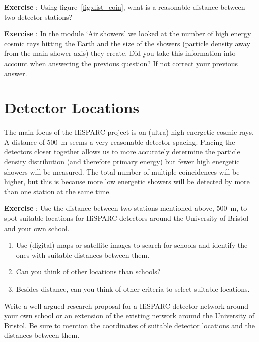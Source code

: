 \documentclass[12pt,a4paper]{article}
\numberwithin{equation}{section}
\numberwithin{figure}{section}
\newcounter{Exercise}
\numberwithin{table}{section}
\begin{document}
\begin{shaded}
\textbf{Exercise \theExercise {}} : Using figure~\ref{fig:dist_coin}, what is a reasonable distance between two detector stations? \end{shaded}

\begin{shaded}
\textbf{Exercise \theExercise {}} : In the module `Air showers' we looked at the number of high energy cosmic rays hitting the Earth and the size of the showers (particle density away from the main shower axis) they create. Did you take this information into account when answering the previous question? If not correct your previous answer.
\end{shaded}

\section{Detector Locations}
The main focus of the HiSPARC project is on (ultra) high energetic cosmic rays.  A distance of 500~m seems a very reasonable detector spacing. Placing the detectors closer together allows us to more accurately determine the particle density distribution (and therefore primary energy) but fewer high energetic showers will be measured. The total number of multiple coincidences will be higher, but this is because more low energetic showers will be detected by more than one station at the same time.

\begin{shaded}
\textbf{Exercise \theExercise {}} : Use the distance between two stations mentioned above, 500~m, to spot suitable locations for HiSPARC detectors around the University of Bristol and your own school.
\begin{enumerate}[-]
\item Use (digital) maps or satellite images to search for schools and identify the ones with suitable distances between them.
\item Can you think of other locations than schools?
\item Besides distance, can you think of other criteria to select suitable locations.
\end{enumerate}
Write a well argued research proposal for a HiSPARC detector network around your own school or an extension of the existing network around the University of Bristol. Be sure to mention the coordinates of suitable detector locations and the distances between them. 
\end{shaded}
\end{document}
